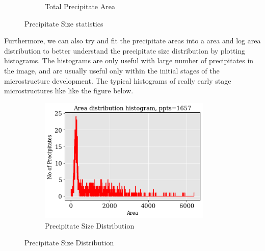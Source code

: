 \documentclass[12pt, a4paper]{report}
\begin{document}
\begin{figure}[H]
\begin{subfigure}{.45\textwidth}
  \caption{Total Precipitate Area}
  \label{img:microstrImg}
\end{subfigure}
\caption{Precipitate Size statistics}
\label{fig:test22}
\end{figure}

Furthermore, we can also try and fit the precipitate areas into a area and log area distribution to better understand the precipitate size distribution by plotting histograms. The histograms are only useful with large number of precipitates in the image, and are usually useful only within the initial stages of the microstructure development. The typical histograms of really early stage microstructures like like the figure below.

\begin{figure}[H]
\centering
\begin{subfigure}{.9\textwidth}
  \centering
  \includegraphics[width=0.9\textwidth]{Pictures/MSFeatures/Area_hist.png}
  \caption{Precipitate Size Distribution}
  \label{img:microstrImg}
\end{subfigure}
\label{fig:test22}
\end{figure}

\end{document}
